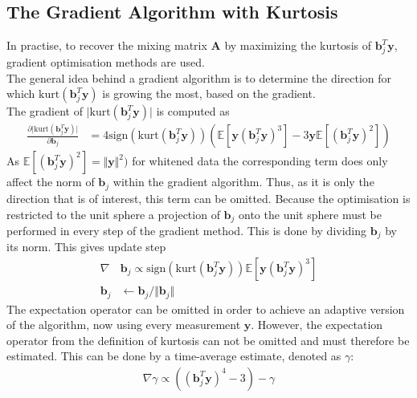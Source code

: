 \subsection{The Gradient Algorithm with Kurtosis}
In practise, to recover the mixing matrix $\textbf{A}$ by maximizing the kurtosis of $\textbf{b}_{j}^T \textbf{y}$, gradient optimisation methods are used.\\
The general idea behind a gradient algorithm is to determine the direction for which $\text{kurt}(\textbf{b}_{j}^T \textbf{y})$ is growing the most, based on the gradient. \\

The gradient of $\vert \text{kurt}(\textbf{b}_{j}^T \textbf{y}) \vert$ is computed as
\begin{align}\label{eq:kurt}
\frac{\partial \vert \text{kurt}(\textbf{b}_{j}^T \textbf{y})\vert}{\partial \mathbf{b}_j} &= 4 \text{sign}(\text{kurt}(\textbf{b}_{j}^T \textbf{y})) (\mathbb{E}[\mathbf{y} (\textbf{b}_{j}^T \textbf{y})^3] - 3 \mathbf{y} \mathbb{E}[(\textbf{b}_{j}^T \textbf{y})^2]) 
\end{align} 
As $\mathbb{E}[(\textbf{b}_{j}^T \textbf{y})^2] =\Vert \mathbf{y} \Vert^2)$ for whitened data the corresponding term does only affect the norm of $\textbf{b}_j$ within the gradient algorithm. Thus, as it is only the direction that is of interest, this term can be omitted. Because the optimisation is restricted to the unit sphere a projection of $\textbf{b}_j$ onto the unit sphere must be performed in every step of the gradient method. This is done by dividing $\textbf{b}_j$ by its norm. This gives update step 
\begin{align*}
\nabla &\textbf{b}_j \propto \text{sign}\left( \text{kurt}(\textbf{b}_{j}^T \textbf{y}) \right) \mathbb{E}[\textbf{y}(\textbf{b}_{j}^T \textbf{y})^3] \\
\textbf{b}_j &\leftarrow \textbf{b}_j/\Vert \textbf{b}_j \Vert
\end{align*}  
The expectation operator can be omitted in order to achieve an adaptive version of the algorithm, now using every measurement $\textbf{y}$. However, the expectation operator from the definition of kurtosis can not be omitted and must therefore be estimated. This can be done by a time-average estimate, denoted as $\gamma$:
\begin{align*}
\nabla \gamma \propto((\textbf{b}_{j}^T \textbf{y})^4 - 3) - \gamma
\end{align*}

